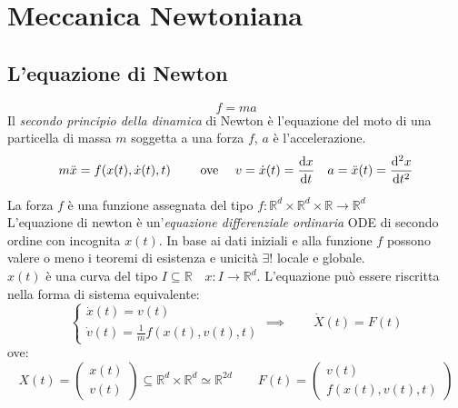 \section{Meccanica Newtoniana}

\subsection{L'equazione di Newton}
\begin{equation}
    f = m a 
\end{equation}
Il \textit{secondo principio della dinamica} di Newton è l'equazione del moto di una particella di massa $m$ 
soggetta a una forza $f$, $a$ è l'accelerazione.\\ 
\begin{equation}
    m \ddot{x} = f( x(t),\dot{x}(t), t) \qquad \text{ ove } \quad v = \dot{x}(t) = \dv{x}{t}\quad a = \ddot{x}(t)= \dv[2]{x}{t}
\end{equation}

La forza $f$ è una funzione assegnata del tipo $f: \mathbb{R}^d\times \mathbb{R}^d \times \mathbb{R} \rightarrow \mathbb{R}^d$\\
L'equazione di newton è un'\textit{equazione differenziale ordinaria} ODE di secondo ordine con incognita $x(t)$. 
In base ai dati iniziali e alla funzione $f$ possono valere o meno i teoremi di esistenza e unicità $\exists!$ locale e globale.\\ 
$x(t)$ è una curva del tipo $I \subseteq \mathbb{R}\quad x: I \rightarrow \mathbb{R}^d $. L'equazione può essere 
riscritta nella forma di sistema equivalente:
\begin{equation}
    \begin{cases}
        \dot{x}(t) = v(t)\\ 
        \dot{v}(t) =\frac{1}{m} f( x(t), v(t), t)
    \end{cases}
    \implies
    \qquad
    \dot{X}(t)= F(t)
\end{equation}
ove:
\begin{equation*}
    X (t) = \begin{pmatrix}
        x (t) \\ 
        v (t)
    \end{pmatrix} \subseteq \mathbb{R}^d \times \mathbb{R}^d \simeq \mathbb{R}^{2d} \qquad
    F (t) = \begin{pmatrix}
        v(t) \\
        f(x(t), v(t),t)
    \end{pmatrix}
\end{equation*}

